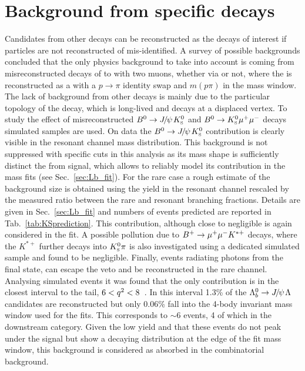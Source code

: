 \section{Background from specific decays}

Candidates from other decays can be reconstructed as the decays of interest if
particles are not reconstructed of mis-identified.
A survey of possible backgrounds concluded that the only physics background
to take into account is coming from misreconstructed decays of \Bz to \KS with
two muons, whether via \jpsi or not, where the \KS is reconstructed as a \Lz with a $p\rightarrow \pi$ identity
swap and $m(p\pi)$ in the \Lz mass window. The lack of background from other decays is
mainly due to the particular topology of the \Lz decay, which is long-lived and decays at a displaced vertex.
To study the effect of misreconstructed $\Bz\ra\jpsi\KS$ and ${{B}^0}\rightarrow{\ensuremath{{K}^0_{\rm\scriptscriptstyle S}}}{\ensuremath{\mu^+\mu^-}}$ decays
simulated samples are used. On data the $\Bz\ra\jpsi\KS$ contribution is clearly visible in the resonant channel mass distribution.
This background is not suppressed with specific cuts in this analysis as its mass shape is sufficiently distinct
the from \Lb signal, which allows to reliably model its contribution in the mass fits (see Sec.~\ref{sec:Lb_fit}).
For the rare case a rough estimate of the \KS background size is obtained using the yield in the resonant channel
rescaled by the measured ratio between the rare and resonant branching fractions.
Details are given in Sec.~\ref{sec:Lb_fit} and numbers of events predicted are reported in Tab.~\ref{tab:KSprediction}.
This contribution, although close to negligible is again considered in the fit.
A possible pollution due to $B^{+} \rightarrow{\ensuremath{\mu^+\mu^-}} K^{*+}$ decays, where the $K^{*+}$
further decays into $\KS\pi$ is also investigated using a dedicated simulated sample and found to be negligible.
Finally, \Lb\ra\jpsi\Lz events radiating photons from the final state, can escape the \jpsi veto
and be reconstructed in the rare channel. Analysing simulated events it was found that the only
contribution is in the closest \qsq interval to the \jpsi tail, $6 < {q^2} < 8$~\gevgevcccc.
In this interval 1.3\% of the $\Lb\to\jpsi\Lz$ candidates are reconstructed but only 0.06\%
fall into the 4-body invariant mass window used for the fits. This corresponds to $\sim 6$
events, 4 of which in the downstream category. Given the low yield and that these events do
not peak under the signal but show a decaying distribution at the edge of the fit mass window, this
background is considered as absorbed in the combinatorial background.
